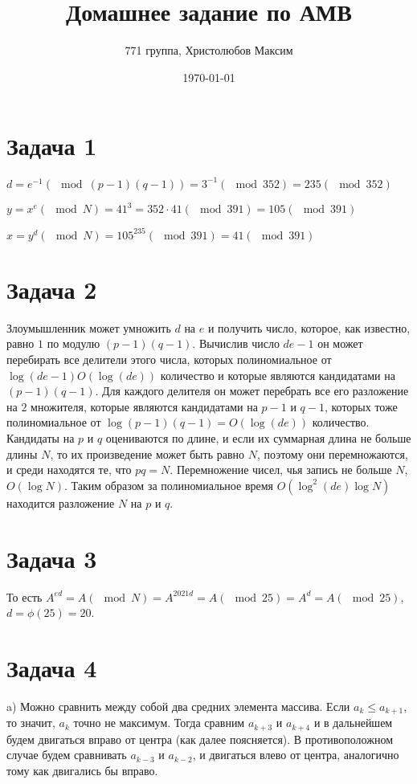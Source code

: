 \documentclass[a4paper,12pt]{article} %
\author{771 группа, Христолюбов Максим}
\title{Домашнее задание по АМВ}
\date{\today}
\begin{document}
	
	\maketitle
	
\section{Задача 1}
\hspace{5mm}
$d=e^{-1}(\mod(p-1)(q-1))=3^{-1}(\mod{352})=235(\mod352)$

$y = x^{e}(\mod N)=41^3=352\cdot 41(\mod391)=105(\mod391)$

$x = y^d(\mod N)=105^{235}(\mod391)=41(\mod391)$

\section{Задача 2}
\hspace{5mm}
Злоумышленник может умножить $d$ на $e$ и получить число, которое, как известно, равно $1$ по модулю $(p-1)(q-1)$. Вычислив число $de-1$ он может перебирать все делители этого числа, которых полиномиальное от $\log{(de-1)}O(\log(de))$ количество и которые являются кандидатами на $(p-1)(q-1)$. Для каждого делителя он может перебрать все его разложение на $2$ множителя, которые являются кандидатами на $p-1$ и $q-1$, которых тоже полиномиальное от $\log(p-1)(q-1)=O(\log(de))$ количество. Кандидаты на $p$ и $q$ оцениваются по длине, и если их суммарная длина не больше длины $N$, то их произведение может быть равно $N$, поэтому они перемножаются, и среди находятся те, что $pq=N$. Перемножение чисел, чья запись не больше $N$, $O(\log N)$. Таким образом за полиномиальное время $O(\log^2(de)\log N)$ находится разложение $N$ на $p$ и $q$.

\section{Задача 3}
\hspace{5mm}
То есть $A^{ed}=A(\mod{N})=A^{2021d}=A(\mod 25)=A^d=A(\mod 25)$, $d=\phi(25)=20$.

\section{Задача 4}
\hspace{5mm}
a) Можно сравнить между собой два средних элемента массива. Если $a_k\leq a_{k+1}$, то значит, $a_k$ точно не максимум. Тогда сравним $a_{k+3}$ и $a_{k+4}$ и в дальнейшем будем двигаться вправо от центра (как далее поясняется). В противоположном случае будем сравнивать $a_{k-3}$ и $a_{k-2}$, и двигаться влево от центра, аналогично тому как двигались бы вправо.
\end{document}
